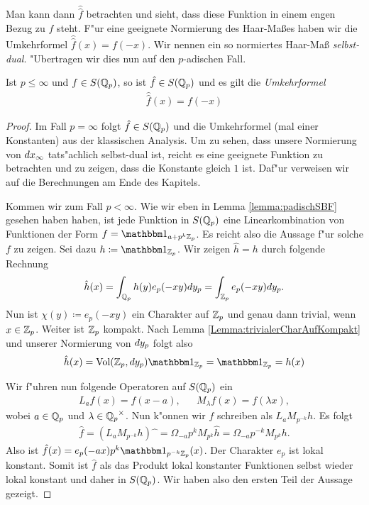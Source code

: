 		Man kann dann $\hat{\hat{f}}$ betrachten und sieht, dass diese Funktion in einem engen Bezug zu $f$ steht. 
		F"ur eine geeignete Normierung des Haar-Maßes haben wir die Umkehrformel  $\hat{\hat{f}}(x)=f(-x)$.
		Wir nennen ein so normiertes Haar-Maß \emph{selbst-dual}.
		"Ubertragen wir dies nun auf den $p$-adischen Fall.
		\begin{satz}\label{satz:lokal:umkehrformel}
			Ist $p\leq\infty$ und $f\in\Sw(\Kp)$, so ist $\hat{f} \in \Sw(\Kp)$ und es gilt die \emph{Umkehrformel}
			\begin{align*}
				\hat{\hat{f}}(x) = f(-x)
			\end{align*}
		\end{satz}
		\begin{proof}
			Im Fall $p=\infty$ folgt $\hat{f} \in \Sw(\Kp)$ und die Umkehrformel (mal einer Konstanten) aus der klassischen Analysis.
			Um zu sehen, dass unsere Normierung von $\dxinfty$ tats"achlich selbst-dual ist, reicht es eine geeignete Funktion zu betrachten und zu zeigen, dass die Konstante gleich $1$ ist. 
			Daf"ur verweisen wir auf die Berechnungen am Ende des Kapitels.
			
			Kommen wir zum Fall $p<\infty$. 
			Wie wir eben in Lemma \ref{lemma:padischSBF} gesehen haben haben, ist jede Funktion in $\Sw(\Kp)$ eine Linearkombination von Funktionen der Form $f = \ind_{a+p^k\Zp}$. 
			Es reicht also die Aussage f"ur solche $f$ zu zeigen.
			Sei dazu $h\coloneqq  \ind_{\Zp}$. Wir zeigen $\hat{h} = h$ durch folgende Rechnung
			\begin{align*}
				\hat{h}(x) = \int_\Kp h(y) e_p (-xy) dy_p = \int_\Zp e_p(-xy) dy_p.
			\end{align*}
			Nun ist $\chi(y)\coloneqq e_p(-xy)$ ein Charakter auf $\Zp$ und genau dann trivial, wenn $x\in\Zp$. 
			Weiter ist $\Zp$ kompakt. 
			Nach Lemma \ref{Lemma:trivialerCharAufKompakt} und unserer Normierung von $\dxp[y]$ folgt also
			\begin{align*}
				\hat{h}(x) = \text{Vol}(\Zp, dy_p) \ind_\Zp = \ind_\Zp = h(x)
			\end{align*}
			
			Wir f"uhren nun folgende Operatoren auf $\Sw(\Kp)$ ein
			\begin{align*}
				L_a f(x) = f(x-a),& &M_\lambda f(x) = f(\lambda x),
			\end{align*}
			wobei $a \in \Kp$ und $\lambda \in \Kp^\times$. 
			Nun k"onnen wir $f$ schreiben als $L_a M_{p^{-k}}h$. 
			Es folgt
			\begin{align*}
				\hat{f} = (L_a M_{p^{-k}}h)\widehat{\phantom{x}} = \Omega_{-a}p^{k}M_{p^k}\hat{h}=\Omega_{-a}p^{-k}M_{p^k}h.
			\end{align*}
			Also ist $\hat{f} (x) = e_p(-ax)p^k\ind_{p^{-k}\Zp}(x)$. 
			Der Charakter $e_p$ ist lokal konstant.
			Somit ist $\hat{f}$ als das Produkt lokal konstanter Funktionen selbst wieder lokal konstant und daher in $\Sw(\Kp)$. 
			Wir haben also den ersten Teil der Aussage gezeigt.
			

\end{proof}
